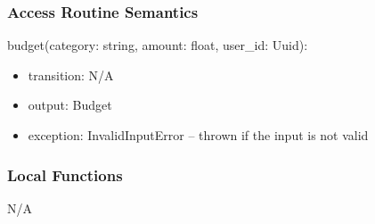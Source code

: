 \documentclass[12pt, titlepage]{article}
\begin{document}
\subsubsection{Access Routine Semantics}

\noindent budget(category: string, amount: float, user\_id: Uuid):
\begin{itemize}
\item transition: N/A
\item output: Budget
\item exception: InvalidInputError -- thrown if the input is not valid
\end{itemize}

\subsubsection{Local Functions}
N/A

\newpage










\end{document}
